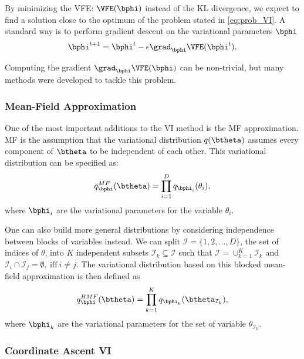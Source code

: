 By minimizing the \ac{VFE}: $\VFE(\bphi)$ instead of the \ac{KL} divergence, we expect to find a solution close to the optimum of the problem stated in \eqref{eq:prob_VI}.
A standard way is to perform gradient descent on the variational parameters $\bphi$
\begin{align}
\bphi^{t+1} = \bphi^{t} - \epsilon \grad_{\bphi}\VFE(\bphi^{t}).
\end{align}

Computing the gradient $\grad_{\bphi}\VFE(\bphi)$ can be non-trivial, but many methods were developed to tackle this problem.

\subsubsection{Mean-Field Approximation}

One of the most important additions to the \ac{VI} method is the \ac{MF} approximation.
\ac{MF} is the assumption that the variational distribution $q(\btheta)$ assumes every component of $\btheta$ to be independent of each other.
This variational distribution can be specified as:
\begin{align}
q^{MF}_{\bphi}(\btheta) = \prod_{i=1}^D q_{\bphi_i}(\theta_i),
\end{align}
where $\bphi_i$ are the variational parameters for the variable $\theta_i$.

One can also build more general distributions by considering independence between blocks of variables instead.
We can split $\mathcal{I}=\{1,2,\ldots,D\}$, the set of indices of $\theta$, into $K$ independent subsets $\mathcal{I}_k \subseteq \mathcal{I}$ such that  $\mathcal{I} = \cup_{k=1}^K \mathcal{I}_{k}$ and $\mathcal{I}_i \cap \mathcal{I}_j=\emptyset,~\mathrm{iff}~i \neq j$.
The variational distribution based on this blocked mean-field approximation is then defined as
\begin{align}
    q^{BMF}_{\bphi}(\btheta) = \prod_{k=1}^K q_{\bphi_k}(\btheta_{\mathcal{I}_k}),
\end{align}
where $\bphi_k$ are the variational parameters for the set of variable $\theta_{\mathcal{I}_k}$.
\subsubsection{Coordinate Ascent VI}

